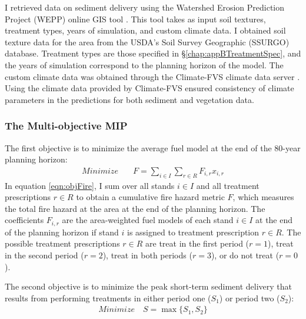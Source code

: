I retrieved data on sediment delivery using the Watershed Erosion Prediction Project (WEPP) online GIS tool \cite{frankenberger2011development}. This tool takes as input soil textures, treatment types, years of simulation, and custom climate data. I obtained soil texture data for the area from the USDA's Soil Survey Geographic (SSURGO) database. Treatment types are those specified in \S \ref{chap:appBTreatmentSpec}, and the years of simulation correspond to the planning horizon of the model. The custom climate data was obtained through the Climate-FVS climate data server \cite{climateFVSReadyData}. Using the climate data provided by Climate-FVS ensured consistency of climate parameters in the predictions for both sediment and vegetation data.

\subsubsection{The Multi-objective MIP}
The first objective is to minimize the average fuel model at the end of the 80-year planning horizon:
\begin{align}
Minimize \quad & F = \sum_{i\in I} \sum_{r\in R} F_{i,r} x_{i,r} \label{eqn:objFire}
\end{align}
In equation \eqref{eqn:objFire}, I sum over all stands $i \in I$ and all treatment prescriptions $r \in R$ to obtain a cumulative fire hazard metric $F$, which measures the total fire hazard at the area at the end of the planning horizon. The coefficients $F_{i,r}$ are the area-weighted fuel models of each stand $i \in I$ at the end of the planning horizon if stand $i$ is assigned to treatment prescription $r \in R$. The possible treatment prescriptions $r \in R$ are treat in the first period ($r=1$), treat in the second period ($r=2$), treat in both periods ($r=3$), or do not treat ($r=0$).

The second objective is to minimize the peak short-term sediment delivery that results from performing treatments in either period one ($S_1$) or period two ($S_2$):
\begin{align}
Minimize \quad S = \max \{S_1,S_2\} \label{eqn:objSediment}
\end{align}

